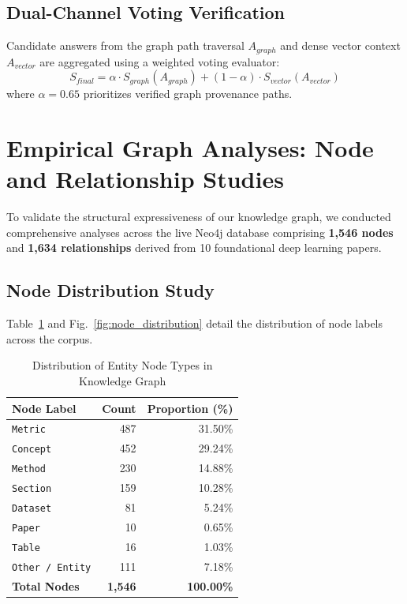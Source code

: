 \documentclass[conference]{IEEEtran}
\begin{document}
\subsection{Dual-Channel Voting Verification}
Candidate answers from the graph path traversal $A_{graph}$ and dense vector context $A_{vector}$ are aggregated using a weighted voting evaluator:
\begin{equation}
S_{final} = \alpha \cdot S_{graph}(A_{graph}) + (1 - \alpha) \cdot S_{vector}(A_{vector})
\end{equation}
where $\alpha = 0.65$ prioritizes verified graph provenance paths.

\section{Empirical Graph Analyses: Node and Relationship Studies}
\label{sec:graph_studies}
To validate the structural expressiveness of our knowledge graph, we conducted comprehensive analyses across the live Neo4j database comprising \textbf{1,546 nodes} and \textbf{1,634 relationships} derived from 10 foundational deep learning papers.

\subsection{Node Distribution Study}
Table~\ref{tab:node_summary} and Fig.~\ref{fig:node_distribution} detail the distribution of node labels across the corpus.

\begin{table}[htbp]
\centering
\caption{Distribution of Entity Node Types in Knowledge Graph}
\label{tab:node_summary}
\begin{tabular}{lrr}
\toprule
\textbf{Node Label} & \textbf{Count} & \textbf{Proportion (\%)} \\
\midrule
\texttt{Metric} & 487 & 31.50\% \\
\texttt{Concept} & 452 & 29.24\% \\
\texttt{Method} & 230 & 14.88\% \\
\texttt{Section} & 159 & 10.28\% \\
\texttt{Dataset} & 81 & 5.24\% \\
\texttt{Paper} & 10 & 0.65\% \\
\texttt{Table} & 16 & 1.03\% \\
\texttt{Other / Entity} & 111 & 7.18\% \\
\midrule
\textbf{Total Nodes} & \textbf{1,546} & \textbf{100.00\%} \\
\bottomrule
\end{tabular}
\end{table}
\end{document}
